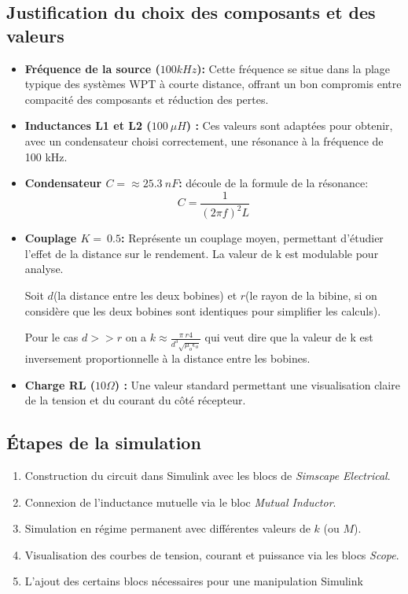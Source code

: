 \documentclass[12pt,a4paper,titlepage,notitlepage]{article}
\begin{document}
	\subsection{Justification du choix des composants et des valeurs}
	\begin{itemize}
		\item \textbf{Fréquence de la source ($100 kHz$):} Cette fréquence se situe dans la plage typique des systèmes WPT à courte distance, offrant un bon compromis entre compacité des composants et réduction des pertes.
		\item \textbf{Inductances L1 et L2 ($100\ \mu H$) :} Ces valeurs sont adaptées pour obtenir, avec un condensateur choisi correctement, une résonance à la fréquence de 100 kHz.
		\item  \textbf{Condensateur  $C = \approx 25.3\ nF$:} découle de la formule de la résonance:  $$C = \frac{1}{(2\pi f)^2 L}$$
		\item \textbf{Couplage $K=\ 0.5$:} Représente un couplage moyen, permettant d'étudier l'effet de la distance sur le rendement. La valeur de k est modulable pour analyse.
		
		Soit $d$(la distance entre les deux bobines) et $r$(le rayon de la bibine, si on considère que les deux bobines sont identiques pour simplifier les calculs).
		
		Pour le cas $d >> r$ on a $k \approx \frac{\pi \ r4}{d^3 \sqrt{\mu_o \epsilon_o}}$ qui veut dire que la valeur de k est inversement proportionnelle à la distance entre les bobines.
		\item \textbf{Charge RL ($10 \Omega$) :} Une valeur standard permettant une visualisation claire de la tension et du courant du côté récepteur.
	\end{itemize}
	
	
	\subsection{Étapes de la simulation}
	
	\begin{enumerate}
		\item Construction du circuit dans Simulink avec les blocs de \textit{Simscape Electrical}.
		\item Connexion de l’inductance mutuelle via le bloc \textit{Mutual Inductor}.
		\item Simulation en régime permanent avec différentes valeurs de $k$ (ou $M$).
		\item Visualisation des courbes de tension, courant et puissance via les blocs \textit{Scope}.
		\item L'ajout des certains blocs nécessaires pour une manipulation Simulink
	\end{enumerate}
	
\end{document}
